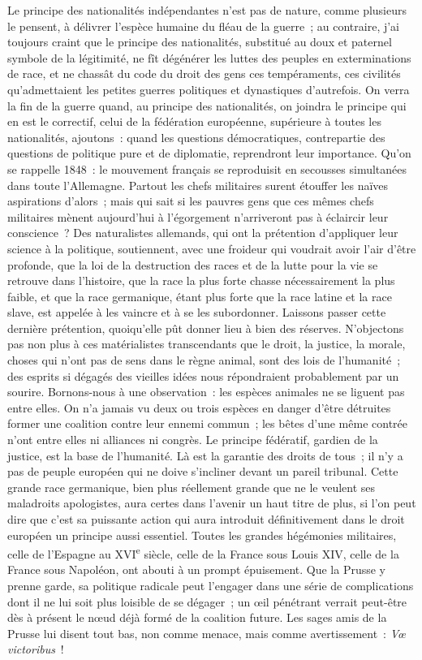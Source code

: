 \documentclass[french,twoside]{book} %
\begin{document}
Le principe des nationalités indépendantes n’est pas de nature, comme plusieurs le pensent, à délivrer l’espèce humaine du fléau de la guerre ; au contraire, j’ai toujours craint que le principe des nationalités, substitué au doux et paternel symbole de la légitimité, ne fît dégénérer les luttes des peuples en exterminations de race, et ne chassât du code du droit des gens ces tempéraments, ces civilités qu’admettaient les petites guerres politiques et dynastiques d’autrefois. On verra la fin de la guerre quand, au principe des nationalités, on joindra le principe qui en est le correctif, celui de la fédération européenne, supérieure à toutes les nationalités, ajoutons : quand les questions démocratiques, contrepartie des questions de politique pure et de diplomatie, reprendront leur importance. Qu’on se rappelle 1848 : le mouvement français se reproduisit en secousses simultanées dans toute l’Allemagne. Partout les chefs militaires surent étouffer les naïves aspirations d’alors ; mais qui sait si les pauvres gens que ces mêmes chefs militaires mènent aujourd’hui à l’égorgement n’arriveront pas à éclaircir leur conscience ? Des naturalistes allemands, qui ont la prétention d’appliquer leur science à la politique, soutiennent, avec une froideur qui voudrait avoir l’air d’être profonde, que la loi de la destruction des races et de la lutte pour la vie se retrouve dans l’histoire, que la race la plus forte chasse nécessairement la plus faible, et que la race germanique, étant plus forte que la race latine et la race slave, est appelée à les vaincre et à se les subordonner. Laissons passer cette dernière prétention, quoiqu’elle pût donner lieu à bien des réserves. N’objectons pas non plus à ces matérialistes transcendants que le droit, la justice, la morale, choses qui n’ont pas de sens dans le règne animal, sont des lois de l’humanité ; des esprits si dégagés des vieilles idées nous répondraient probablement par un sourire. Bornons-nous à une observation : les espèces animales ne se liguent pas entre elles. On n’a jamais vu deux ou trois espèces en danger d’être détruites former une coalition contre leur ennemi commun ; les bêtes d’une même contrée n’ont entre elles ni alliances ni congrès. Le principe fédératif, gardien de la justice, est la base de l’humanité. Là est la garantie des droits de tous ; il n’y a pas de peuple européen qui ne doive s’incliner devant un pareil tribunal. Cette grande race germanique, bien plus réellement grande que ne le veulent ses maladroits apologistes, aura certes dans l’avenir un haut titre de plus, si l’on peut dire que c’est sa puissante action qui aura introduit définitivement dans le droit européen un principe aussi essentiel. Toutes les grandes hégémonies militaires, celle de l’Espagne au XVI\textsuperscript{e} siècle, celle de la France sous Louis XIV, celle de la France sous Napoléon, ont abouti à un prompt épuisement. Que la Prusse y prenne garde, sa politique radicale peut l’engager dans une série de complications dont il ne lui soit plus loisible de se dégager ; un œil pénétrant verrait peut-être dès à présent le nœud déjà formé de la coalition future. Les sages amis de la Prusse lui disent tout bas, non comme menace, mais comme avertissement : {\itshape Vœ victoribus} !\par
\end{document}
